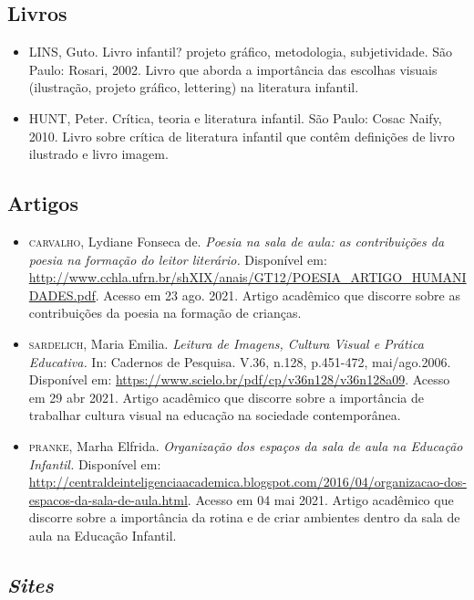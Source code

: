 \documentclass[11pt]{extarticle}
\begin{document}
\subsection{Livros} 

\begin{itemize}
\item LINS, Guto. Livro infantil? projeto gráfico, metodologia, subjetividade. São Paulo: Rosari, 2002.
Livro que aborda a importância das escolhas visuais (ilustração, projeto gráfico, lettering) na literatura infantil.  

\item HUNT, Peter. Crítica, teoria e literatura infantil. São Paulo: Cosac Naify, 2010.
Livro sobre crítica de literatura infantil que contêm definições de livro ilustrado e livro imagem. 
\end{itemize}

\subsection{Artigos}

\begin{itemize}

	\item \textsc{carvalho}, Lydiane Fonseca de. \emph{Poesia na sala de aula: as contribuições da poesia na formação
	do leitor literário.} Disponível em: \url{http://www.cchla.ufrn.br/shXIX/anais/GT12/POESIA_ARTIGO_HUMANIDADES.pdf}. Acesso em 23 ago. 2021.
	Artigo acadêmico que discorre sobre as contribuições da poesia na formação de crianças.
	\item \textsc{sardelich}, Maria Emilia. \emph{Leitura de Imagens, Cultura Visual e Prática Educativa.} 
In: Cadernos de Pesquisa. V.36, n.128, p.451-472, mai/ago.2006. Disponível em: \url{https://www.scielo.br/pdf/cp/v36n128/v36n128a09}. 
Acesso em 29 abr 2021. 
Artigo acadêmico que discorre sobre a importância de trabalhar cultura 
visual na educação na sociedade contemporânea. 

\item \textsc{pranke}, Marha Elfrida. \emph{Organização dos espaços da sala de aula na Educação Infantil.} Disponível em: 
\url{http://centraldeinteligenciaacademica.blogspot.com/2016/04/organizacao-dos-espacos-da-sala-de-aula.html}. Acesso em 04 mai 2021. 
Artigo acadêmico que discorre sobre a importância da rotina e de criar ambientes dentro da sala de aula na Educação Infantil.  
\end{itemize}

\subsection{\textit{Sites}}
\end{document}
